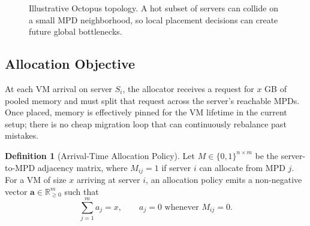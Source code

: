 \documentclass[11pt]{article}
\theoremstyle{definition}
\newtheorem{definition}{Definition}[section]
\begin{document}
\begin{figure}[H]
\centering
{}
\caption{Illustrative Octopus topology. A hot subset of servers can collide on a
small MPD neighborhood, so local placement decisions can create future global
bottlenecks.}
\label{fig:octopus_topology}
\end{figure}

\subsection{Allocation Objective}

At each VM arrival on server $S_i$, the allocator receives a request for $x$ GB
of pooled memory and must split that request across the server's reachable MPDs.
Once placed, memory is effectively pinned for the VM lifetime in the current
setup; there is no cheap migration loop that can continuously rebalance past
mistakes.

\begin{definition}[Arrival-Time Allocation Policy]
Let $M \in \{0,1\}^{n \times m}$ be the server-to-MPD adjacency matrix, where
$M_{ij} = 1$ if server $i$ can allocate from MPD $j$. For a VM of size $x$
arriving at server $i$, an allocation policy emits a non-negative vector
$\mathbf{a} \in \mathbb{R}_{\ge 0}^{m}$ such that
\begin{equation}
    \sum_{j=1}^{m} a_j = x,
    \qquad
    a_j = 0 \text{ whenever } M_{ij} = 0.
\end{equation}
\end{definition}
\end{document}
